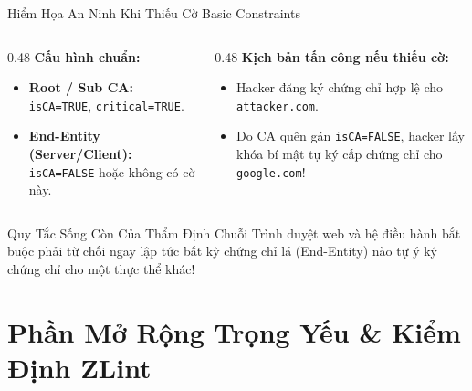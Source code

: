 \begin{frame}{Hiểm Họa An Ninh Khi Thiếu Cờ Basic Constraints}
  \begin{columns}[T]
    \begin{column}{0.48\textwidth}
      \textbf{Cấu hình chuẩn:}
      \begin{itemize}\small
        \item \textbf{Root / Sub CA:} \texttt{isCA=TRUE}, \texttt{critical=TRUE}.
        \item \textbf{End-Entity (Server/Client):} \texttt{isCA=FALSE} hoặc không có cờ này.
      \end{itemize}
    \end{column}
    \begin{column}{0.48\textwidth}
      \textbf{Kịch bản tấn công nếu thiếu cờ:}
      \begin{itemize}\small
        \item Hacker đăng ký chứng chỉ hợp lệ cho \texttt{attacker.com}.
        \item Do CA quên gán \texttt{isCA=FALSE}, hacker lấy khóa bí mật tự ký cấp chứng chỉ cho \texttt{google.com}!
      \end{itemize}
    \end{column}
  \end{columns}

  \begin{alertblock}{Quy Tắc Sống Còn Của Thẩm Định Chuỗi}
    Trình duyệt web và hệ điều hành bắt buộc phải từ chối ngay lập tức bất kỳ chứng chỉ lá (End-Entity) nào tự ý ký chứng chỉ cho một thực thể khác!
  \end{alertblock}
\end{frame}

\section{Phần Mở Rộng Trọng Yếu \& Kiểm Định ZLint}


